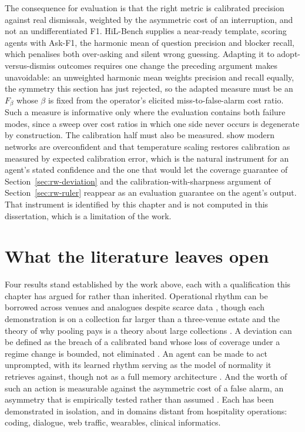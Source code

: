 The consequence for evaluation is that the right metric is calibrated precision
against real dismissals, weighted by the asymmetric cost of an interruption, and
not an undifferentiated F1. HiL-Bench
\citep[a 2026 preprint]{trinh_hil-bench_2026} supplies a near-ready template,
scoring agents with Ask-F1, the harmonic mean of question precision and blocker
recall, which penalises both over-asking and silent wrong guessing. Adapting it
to adopt-versus-dismiss outcomes requires one change the preceding argument makes
unavoidable: an unweighted harmonic mean weights precision and recall equally,
the symmetry this section has just rejected, so the adapted measure must be an
$F_\beta$ whose $\beta$ is fixed from the operator's elicited miss-to-false-alarm
cost ratio. Such a measure is informative only where the evaluation contains both
failure modes, since a sweep over cost ratios in which one side never occurs is
degenerate by construction. The calibration half must also be measured.
\citet{guo_calibration_2017} show modern networks are overconfident and that
temperature scaling restores calibration as measured by expected calibration
error, which is the natural instrument for an agent's stated confidence and the
one that would let the coverage guarantee of Section~\ref{sec:rw-deviation} and
the calibration-with-sharpness argument of Section~\ref{sec:rw-ruler} reappear as
an evaluation guarantee on the agent's output. That instrument is identified by
this chapter and is not computed in this dissertation, which is a limitation of
the work.

\section{What the literature leaves open}
\label{sec:rw-synthesis}

Four results stand established by the work above, each with a qualification this
chapter has argued for rather than inherited. Operational rhythm can be borrowed
across venues and analogues despite scarce data
\citep{das_-context_2025,zhou_context-driven_2025,liu_generative_2024}, though
each demonstration is on a collection far larger than a three-venue estate and
the theory of why pooling pays is a theory about large collections
\citep{montero-manso_principles_2021}. A deviation can be defined as the breach
of a calibrated band whose loss of coverage under a regime change is bounded, not
eliminated \citep{sun_conformal_2025,barber_conformal_2023,liu_elephant_2024}. An
agent can be made to act unprompted, with its learned rhythm serving as the model
of normality it retrieves against, though not as a full memory architecture
\citep{lu_proactive_2024,hu_memory_2026,park_generative_2023}. And the worth of
such an action is measurable against the asymmetric cost of a false alarm, an
asymmetry that is empirically tested rather than assumed
\citep{meyer_conceptual_2004,dixon_independence_2007,ancker_effects_2017,fu_prism_2026,trinh_hil-bench_2026}.
Each has been demonstrated in isolation, and in domains distant from hospitality
operations: coding, dialogue, web traffic, wearables, clinical informatics.

